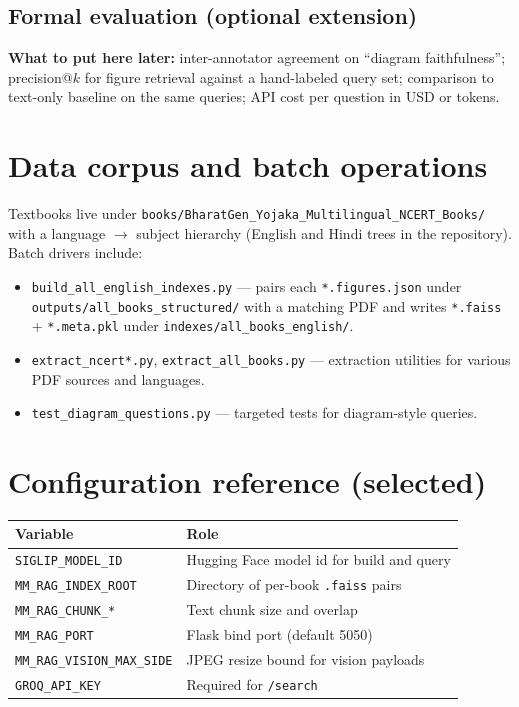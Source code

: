 \documentclass[11pt]{article}
\begin{document}
\subsection{Formal evaluation (optional extension)}
\label{res:eval}

\textbf{What to put here later:} inter-annotator agreement on ``diagram faithfulness''; precision@$k$ for figure retrieval against a hand-labeled query set; comparison to text-only baseline on the same queries; API cost per question in USD or tokens.

\section{Data corpus and batch operations}
\label{sec:data}

Textbooks live under \texttt{books/BharatGen\_Yojaka\_Multilingual\_NCERT\_Books/} with a language $\rightarrow$ subject hierarchy (English and Hindi trees in the repository). Batch drivers include:

\begin{itemize}
  \item \texttt{build\_all\_english\_indexes.py} --- pairs each \texttt{*.figures.json} under \texttt{outputs/all\_books\_structured/} with a matching PDF and writes \texttt{*.faiss} + \texttt{*.meta.pkl} under \texttt{indexes/all\_books\_english/}.
  \item \texttt{extract\_ncert*.py}, \texttt{extract\_all\_books.py} --- extraction utilities for various PDF sources and languages.
  \item \texttt{test\_diagram\_questions.py} --- targeted tests for diagram-style queries.
\end{itemize}

\section{Configuration reference (selected)}

\begin{center}
\small
\begin{tabular}{@{}ll@{}}
\toprule
Variable & Role \\
\midrule
\texttt{SIGLIP\_MODEL\_ID} & Hugging Face model id for build and query \\
\texttt{MM\_RAG\_INDEX\_ROOT} & Directory of per-book \texttt{.faiss} pairs \\
\texttt{MM\_RAG\_CHUNK\_*} & Text chunk size and overlap \\
\texttt{MM\_RAG\_PORT} & Flask bind port (default 5050) \\
\texttt{MM\_RAG\_VISION\_MAX\_SIDE} & JPEG resize bound for vision payloads \\
\texttt{GROQ\_API\_KEY} & Required for \texttt{/search} \\
\bottomrule
\end{tabular}
\end{center}
\end{document}
